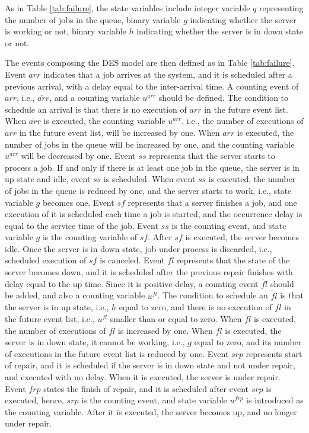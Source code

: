 \documentclass[suppldata]{interact}
\theoremstyle{plain}
\theoremstyle{definition}
\theoremstyle{remark}
\begin{document}
As in Table \ref{tab:failure}, the state variables include integer variable $q$ representing the number of jobs in the queue, binary variable $g$ indicating whether the server is working or not, binary variable $h$ indicating whether the server is in down state or not.%

The events composing the DES model are then defined as in Table \ref{tab:failure}. Event ${arr}$ indicates that a job arrives at the system, and it is scheduled after a previous arrival, with a delay equal to the inter-arrival time. A counting event of ${arr}$, i.e., ${\tilde{arr}}$, and a counting variable $u^{arr}$ should be defined. The condition to schedule an arrival is that there is no execution of ${arr}$ in the future event list. When ${\tilde{arr}}$ is executed, the counting variable $u^{arr}$, i.e., the number of executions of ${arr}$ in the future event list, will be increased by one. When ${arr}$ is executed, the number of jobs in the queue will be increased by one, and the counting variable $u^{arr}$ will be decreased by one. Event ${ss}$ represents that the server starts to process a job. If and only if there is at least one job in the queue, the server is in up state and idle, event ${ss}$ is scheduled. When event ${ss}$ is executed, the number of jobs in the queue is reduced by one, and the server starts to work, i.e., state variable $g$ becomes one. Event ${sf}$ represents that a server finishes a job, and one execution of it is scheduled each time a job is started, and the occurrence delay is equal to the service time of the job. Event ${ss}$ is the counting event, and state variable $g$ is the counting variable of ${sf}$. After ${sf}$ is executed, the server becomes idle. Once the server is in down state, job under process is discarded, i.e., scheduled execution of ${sf}$ is canceled. Event ${fl}$ represents that the state of the server becomes down, and it is scheduled after the previous repair finishes with delay equal to the up time. Since it is positive-delay, a counting event ${\tilde{fl}}$ should be added, and also a counting variable $u^{fl}$. The condition to schedule an ${\tilde{fl}}$ is that the server is in up state, i.e., $h$ equal to zero, and there is no execution of ${fl}$ in the future event list, i.e., $u^{fl}$ smaller than or equal to zero. When ${\tilde{fl}}$ is executed, the number of executions of ${fl}$ is increased by one. When ${fl}$ is executed, the server is in down state, it cannot be working, i.e., $g$ equal to zero, and its number of executions in the future event list is reduced by one. Event ${srp}$ represents start of repair, and it is scheduled if the server is in down state and not under repair, and executed with no delay. When it is executed, the server is under repair. Event ${frp}$ states the finish of repair, and it is scheduled after event ${srp}$ is executed, hence, ${srp}$ is the counting event, and state variable $u^{frp}$ is introduced as the counting variable. After it is executed, the server becomes up, and no longer under repair. %
\end{document}
